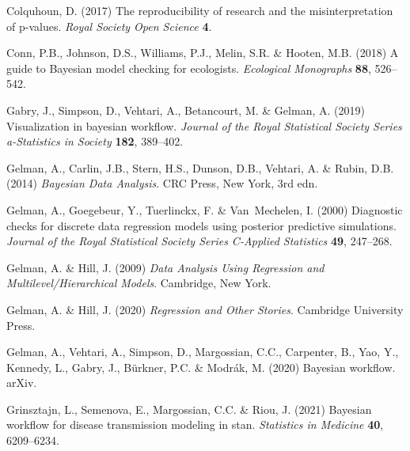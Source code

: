 \documentclass[11pt]{article}
\begin{document}
\begin{thebibliography}{35}
Colquhoun, D. (2017) The reproducibility of research and the misinterpretation
  of p-values. \emph{Royal Society Open Science} \textbf{4}.

Conn, P.B., Johnson, D.S., Williams, P.J., Melin, S.R. \& Hooten, M.B. (2018)
  {A guide to Bayesian model checking for ecologists}. \emph{Ecological
  Monographs} \textbf{88}, 526--542.

Gabry, J., Simpson, D., Vehtari, A., Betancourt, M. \& Gelman, A. (2019)
  Visualization in bayesian workflow. \emph{Journal of the Royal Statistical
  Society Series a-Statistics in Society} \textbf{182}, 389--402.

Gelman, A., Carlin, J.B., Stern, H.S., Dunson, D.B., Vehtari, A. \& Rubin, D.B.
  (2014) \emph{Bayesian Data Analysis}. CRC Press, New York, 3rd edn.

Gelman, A., Goegebeur, Y., Tuerlinckx, F. \& Van~Mechelen, I. (2000) Diagnostic
  checks for discrete data regression models using posterior predictive
  simulations. \emph{Journal of the Royal Statistical Society Series C-Applied
  Statistics} \textbf{49}, 247--268.

Gelman, A. \& Hill, J. (2009) \emph{Data Analysis Using Regression and
  Multilevel/Hierarchical Models}. Cambridge, New York.

Gelman, A. \& Hill, J. (2020) \emph{Regression and Other Stories}. Cambridge
  University Press.

Gelman, A., Vehtari, A., Simpson, D., Margossian, C.C., Carpenter, B., Yao, Y.,
  Kennedy, L., Gabry, J., B{\"u}rkner, P.C. \& Modr{\'a}k, M. (2020) Bayesian
  workflow. arXiv.

Grinsztajn, L., Semenova, E., Margossian, C.C. \& Riou, J. (2021) Bayesian
  workflow for disease transmission modeling in stan. \emph{Statistics in
  Medicine} \textbf{40}, 6209--6234.


\end{thebibliography}
\end{document}
